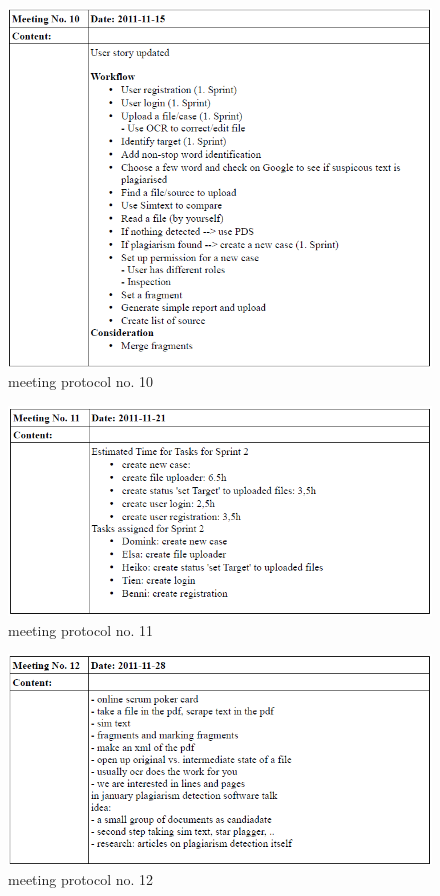 \begin{appendix}
\begin{figure}[htbp]
  \centering
    \includegraphics[width=\textwidth]{images/a_meetings/meeting_10.png}
  \caption{meeting protocol no. 10}
  \label{fig:meeting protocol no. 10}
\end{figure}

\begin{figure}[htbp]
  \centering
    \includegraphics[width=\textwidth]{images/a_meetings/meeting_11.png}
  \caption{meeting protocol no. 11}
  \label{fig:meeting protocol no. 11}
\end{figure}

\begin{figure}[htbp]
  \centering
    \includegraphics[width=\textwidth]{images/a_meetings/meeting_12.png}
  \caption{meeting protocol no. 12}
  \label{fig:meeting protocol no. 12}
\end{figure}


\end{appendix}
